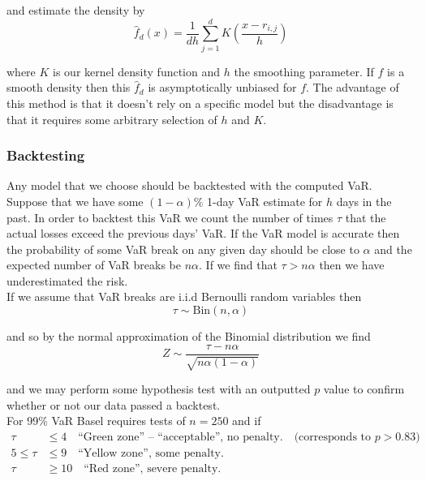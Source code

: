 \documentclass[12pt]{article}
\newlength\tindent
\renewcommand{\indent}{\hspace*{\tindent}}
\begin{document}
and estimate the density by
\begin{equation*}
	\hat{f}_d(x) = \frac{1}{dh} \sum^d_{j = 1} K \left( \frac{x - r_{i,j}}{h} \right)
\end{equation*}

where $K$ is our kernel density function and $h$ the smoothing parameter. If $f$ is a smooth density then this $\hat{f}_d$ is asymptotically unbiased for $f$. The advantage of this method is that it doesn't rely on a specific model but the disadvantage is that it requires some arbitrary selection of $h$ and $K$.

\subsubsection{Backtesting}

\indent Any model that we choose should be backtested with the computed VaR. Suppose that we have some $(1 - \alpha)\%$ 1-day VaR estimate for $h$ days in the past. In order to backtest this VaR we count the number of times $\tau$ that the actual losses exceed the previous days' VaR. If the VaR model is accurate then the probability of some VaR break on any given day should be close to $\alpha$ and the expected number of VaR breaks be $n\alpha$. If we find that $\tau > n\alpha$ then we have underestimated the risk. \\

If we assume that VaR breaks are i.i.d Bernoulli random variables then
\begin{equation*}
	\tau \sim \text{Bin}(n, \alpha)
\end{equation*}

and so by the normal approximation of the Binomial distribution we find
\begin{equation*}
	Z \sim \frac{\tau - n\alpha}{\sqrt{n\alpha(1 - \alpha)}}
\end{equation*}

and we may perform some hypothesis test with an outputted $p$ value to confirm whether or not our data passed a backtest. \\

For 99\% VaR Basel requires tests of $n = 250$ and if 
\begin{align*}
	\tau &\leq 4 \quad \text{``Green zone'' -- ``acceptable'', no penalty.} \quad \text{(corresponds to } p > 0.83) \\
	 5 \leq \tau & \leq 9 \quad \text{``Yellow zone'', some penalty.} \\
	 \tau &\geq 10 \quad \text{``Red zone'', severe penalty.} 
\end{align*}
\end{document}
